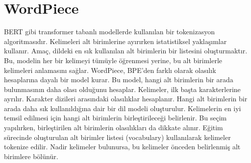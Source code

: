 \section{WordPiece}

BERT gibi transformer tabanlı modellerde kullanılan bir tokenizasyon algoritmasıdır. Kelimeleri alt birimlerine ayırırken istatistiksel yaklaşımlar kullanır. Amaç, dildeki en sık kullanılan alt birimlerin bir listesini oluşturmaktır. Bu, modelin her bir kelimeyi tümüyle öğrenmesi yerine, bu alt birimlerle kelimeleri anlamasını sağlar. WordPiece, BPE’den farklı olarak olasılık hesaplarına dayalı bir model kurar. Bu model, hangi alt birimlerin bir arada bulunmasının daha olası olduğunu hesaplar. Kelimeler, ilk başta karakterlerine ayrılır.  Karakter dizileri arasındaki olasılıklar hesaplanır. Hangi alt birimlerin bir arada daha sık kullanıldığına dair bir dil modeli oluşturulur. Kelimelerin en iyi temsil edilmesi için hangi alt birimlerin birleştirileceği belirlenir. Bu seçim yapılırken, birleştirilen alt birimlerin olasılıkları da dikkate alınır. Eğitim sürecinde oluşturulan alt birimler listesi (vocabulary) kullanılarak kelimeler tokenize edilir. Nadir kelimeler bulunursa, bu kelimeler önceden belirlenmiş alt birimlere bölünür.


\newpage